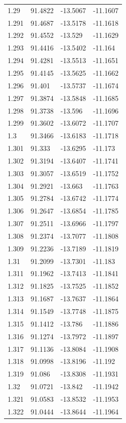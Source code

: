 \begin{tabular}{llll}
1.29 & 91.4822 & -13.5067 & -11.1607 \\
1.291 & 91.4687 & -13.5178 & -11.1618 \\
1.292 & 91.4552 & -13.529 & -11.1629 \\
1.293 & 91.4416 & -13.5402 & -11.164 \\
1.294 & 91.4281 & -13.5513 & -11.1651 \\
1.295 & 91.4145 & -13.5625 & -11.1662 \\
1.296 & 91.401 & -13.5737 & -11.1674 \\
1.297 & 91.3874 & -13.5848 & -11.1685 \\
1.298 & 91.3738 & -13.596 & -11.1696 \\
1.299 & 91.3602 & -13.6072 & -11.1707 \\
1.3 & 91.3466 & -13.6183 & -11.1718 \\
1.301 & 91.333 & -13.6295 & -11.173 \\
1.302 & 91.3194 & -13.6407 & -11.1741 \\
1.303 & 91.3057 & -13.6519 & -11.1752 \\
1.304 & 91.2921 & -13.663 & -11.1763 \\
1.305 & 91.2784 & -13.6742 & -11.1774 \\
1.306 & 91.2647 & -13.6854 & -11.1785 \\
1.307 & 91.2511 & -13.6966 & -11.1797 \\
1.308 & 91.2374 & -13.7077 & -11.1808 \\
1.309 & 91.2236 & -13.7189 & -11.1819 \\
1.31 & 91.2099 & -13.7301 & -11.183 \\
1.311 & 91.1962 & -13.7413 & -11.1841 \\
1.312 & 91.1825 & -13.7525 & -11.1852 \\
1.313 & 91.1687 & -13.7637 & -11.1864 \\
1.314 & 91.1549 & -13.7748 & -11.1875 \\
1.315 & 91.1412 & -13.786 & -11.1886 \\
1.316 & 91.1274 & -13.7972 & -11.1897 \\
1.317 & 91.1136 & -13.8084 & -11.1908 \\
1.318 & 91.0998 & -13.8196 & -11.192 \\
1.319 & 91.086 & -13.8308 & -11.1931 \\
1.32 & 91.0721 & -13.842 & -11.1942 \\
1.321 & 91.0583 & -13.8532 & -11.1953 \\
1.322 & 91.0444 & -13.8644 & -11.1964 \\

\end{tabular}
